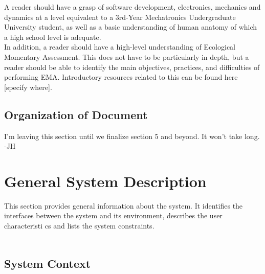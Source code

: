 \documentclass[12pt]{article}
\begin{document}
A reader should have a grasp of software development, electronics, mechanics and dynamics at a level equivalent to a 3rd-Year Mechatronics Undergraduate University student, as well as a basic understanding of human anatomy of which a high school level is adequate. \\

In addition, a reader should have a high-level understanding of Ecological Momentary Assessment. This does not have to be particularly in depth, but a reader should be able to identify the main objectives, practices, and difficulties of performing EMA. Introductory resources related to this can be found here [specify where]. \\

\subsection{Organization of Document}
I'm leaving this section until we finalize section 5 and beyond. It won't take long. -JH\\


\section{General System Description}

This section provides general information about the system.  It identifies the
interfaces between the system and its environment, describes the user
characteristi	cs and lists the system constraints.  \\\\
\subsection{System Context}
\end{document}
